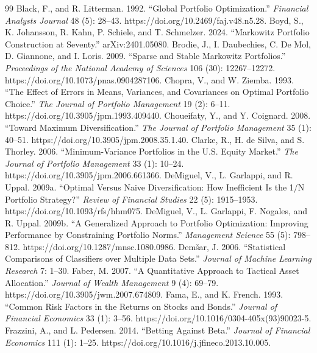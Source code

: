\documentclass[12pt,letterpaper]{article}
\begin{document}
\begin{thebibliography}{99}
 Black, F., and R. Litterman. 1992. ``Global Portfolio Optimization.'' \emph{Financial Analysts Journal} 48 (5): 28–43. https://doi.org/10.2469/faj.v48.n5.28.
 Boyd, S., K. Johansson, R. Kahn, P. Schiele, and T. Schmelzer. 2024. ``Markowitz Portfolio Construction at Seventy.'' arXiv:2401.05080.
 Brodie, J., I. Daubechies, C. De Mol, D. Giannone, and I. Loris. 2009. ``Sparse and Stable Markowitz Portfolios.'' \emph{Proceedings of the National Academy of Sciences} 106 (30): 12267–12272. https://doi.org/10.1073/pnas.0904287106.
 Chopra, V., and W. Ziemba. 1993. ``The Effect of Errors in Means, Variances, and Covariances on Optimal Portfolio Choice.'' \emph{The Journal of Portfolio Management} 19 (2): 6–11. https://doi.org/10.3905/jpm.1993.409440.
 Choueifaty, Y., and Y. Coignard. 2008. ``Toward Maximum Diversification.'' \emph{The Journal of Portfolio Management} 35 (1): 40–51. https://doi.org/10.3905/jpm.2008.35.1.40.
 Clarke, R., H. de Silva, and S. Thorley. 2006. ``Minimum-Variance Portfolios in the U.S. Equity Market.'' \emph{The Journal of Portfolio Management} 33 (1): 10–24. https://doi.org/10.3905/jpm.2006.661366.
 DeMiguel, V., L. Garlappi, and R. Uppal. 2009a. ``Optimal Versus Naive Diversification: How Inefficient Is the 1/N Portfolio Strategy?'' \emph{Review of Financial Studies} 22 (5): 1915–1953. https://doi.org/10.1093/rfs/hhm075.
 DeMiguel, V., L. Garlappi, F. Nogales, and R. Uppal. 2009b. ``A Generalized Approach to Portfolio Optimization: Improving Performance by Constraining Portfolio Norms.'' \emph{Management Science} 55 (5): 798–812. https://doi.org/10.1287/mnsc.1080.0986.
 Dem\v{s}ar, J. 2006. ``Statistical Comparisons of Classifiers over Multiple Data Sets.'' \emph{Journal of Machine Learning Research} 7: 1--30.
 Faber, M. 2007. ``A Quantitative Approach to Tactical Asset Allocation.'' \emph{Journal of Wealth Management} 9 (4): 69–79. https://doi.org/10.3905/jwm.2007.674809.
 Fama, E., and K. French. 1993. ``Common Risk Factors in the Returns on Stocks and Bonds.'' \emph{Journal of Financial Economics} 33 (1): 3–56. https://doi.org/10.1016/0304-405x(93)90023-5.
 Frazzini, A., and L. Pedersen. 2014. ``Betting Against Beta.'' \emph{Journal of Financial Economics} 111 (1): 1–25. https://doi.org/10.1016/j.jfineco.2013.10.005.

\end{thebibliography}
\end{document}
